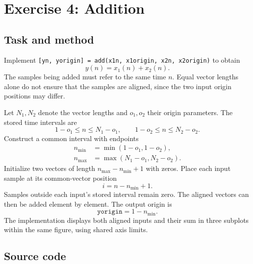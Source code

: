 \section{Exercise 4: Addition}
\subsection{Task and method}
Implement \texttt{[yn, yorigin] = add(x1n, x1origin, x2n, x2origin)}
to obtain
\begin{equation}
  y(n)=x_1(n)+x_2(n).
\end{equation}
The samples being added must refer to the same time $n$. Equal vector
lengths alone do not ensure that the samples are aligned, since the
two input origin positions may differ.

Let $N_1,N_2$ denote the vector lengths and $o_1,o_2$ their origin
parameters. The stored time intervals are
\[
  1-o_1\leq n\leq N_1-o_1,\qquad
  1-o_2\leq n\leq N_2-o_2.
\]
Construct a common interval with endpoints
\begin{align}
  n_{\min}&=\min(1-o_1,1-o_2),\\
  n_{\max}&=\max(N_1-o_1,N_2-o_2).
\end{align}
Initialize two vectors of length $n_{\max}-n_{\min}+1$ with zeros.
Place each input sample at its common-vector position
\begin{equation}
  i=n-n_{\min}+1.
\end{equation}
Samples outside each input's stored interval remain zero. The aligned
vectors can then be added element by element. The output origin is
\begin{equation}
  \texttt{yorigin}=1-n_{\min}.
\end{equation}
The implementation displays both aligned inputs and their sum in three
subplots within the same figure, using shared axis limits.

\subsection{Source code}


